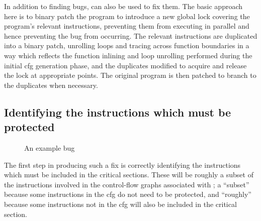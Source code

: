 In addition to finding bugs, {\technique} can also be used to fix
them.  The basic approach here is to binary patch the program to
introduce a new global lock covering the program's relevant
instructions, preventing them from executing in parallel and hence
preventing the bug from occurring.  The relevant instructions are
duplicated into a binary patch, unrolling loops and tracing across
function boundaries in a way which reflects the function inlining and
loop unrolling performed during the initial \gls{cfg} generation phase, and
the duplicates modified to acquire and release the lock at appropriate
points.  The original program is then patched to branch to the
duplicates when necessary.

\subsection{Identifying the instructions which must be protected}

\begin{figure}
  \hspace{-5mm}
  \hspace{-10mm}
  \caption{An example bug}
  \label{fig:fix_bug:complex_local}
\end{figure}

The first step in producing such a fix is correctly identifying the
instructions which must be included in the critical sections.  These
will be roughly a subset of the instructions involved in the
control-flow graphs associated with \StateMachines; a ``subset''
because some instructions in the \gls{cfg} do not need to be protected, and
``roughly'' because some instructions not in the \gls{cfg} will also be
included in the critical section.

